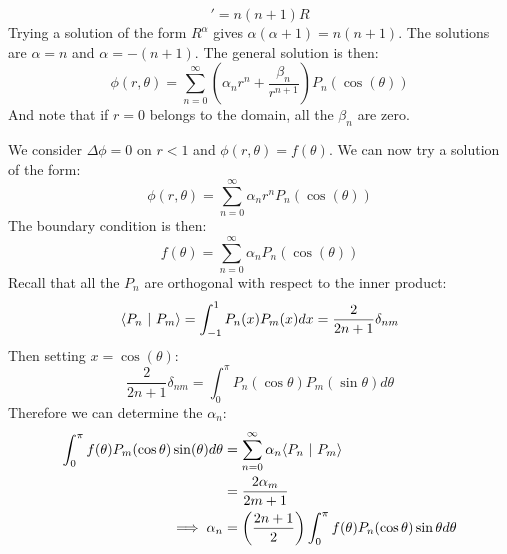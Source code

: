 \documentclass[../Main.tex]{subfiles}
\begin{document}
\begin{equation*}
    [r^2 R']' = n(n+1)R
\end{equation*}
Trying a solution of the form $R^\alpha$ gives $\alpha(\alpha+1) = n(n+1)$. The solutions are $\alpha = n$ and $\alpha = -(n+1)$. The general solution is then:
\begin{equation*}
    \phi(r, \theta) = \sum_{n=0}^{\infty} \left(\alpha_n r^n + \frac{\beta_n}{r^{n+1}}\right) P_n(\cos(\theta))
\end{equation*}
And note that if $r = 0$ belongs to the domain, all the $\beta_n$ are zero.
\begin{example}
    We consider $\Delta \phi = 0$ on $r < 1$ and $\phi(r, \theta) = f(\theta)$. We can now try a solution of the form:
    \begin{equation*}
        \phi(r, \theta) = \sum_{n=0}^{\infty} \alpha_nr^n P_n(\cos(\theta))
    \end{equation*}
    The boundary condition is then:
    \begin{equation*}
        f(\theta) = \sum_{n=0}^{\infty} \alpha_n P_n(\cos(\theta))
    \end{equation*}
    Recall that all the $P_n$ are orthogonal with respect to the inner product:
    \begin{equation*}
        \langle P_n~\vert~P_m\rangle = \int_{-1}^{1} P_n(x)P_m(x) dx = \frac{2}{2n+1}\delta_{nm}
    \end{equation*}
    Then setting $x = \cos(\theta)$:
    \begin{equation*}
        \frac{2}{2n+1}\delta_{nm} = \int_{0}^{\pi} P_n(\cos{\theta}) P_m (\sin{\theta}) d\theta
    \end{equation*}
    Therefore we can determine the $\alpha_n$:
    \begin{align*}
        \int_{0}^{\pi} f(\theta)P_m(\cos{\theta}) \sin(\theta) d\theta &= \sum_{n=0}^{\infty} \alpha_n \langle P_n~\vert~P_m\rangle \\
        &= \frac{2\alpha_m}{2m+1} \\
        \implies \alpha_n &= \left(\frac{2n+1}{2}\right) \int_{0}^{\pi} f(\theta) P_n(\cos{\theta}) \sin{\theta} d\theta
    \end{align*}
\end{example}
\end{document}
